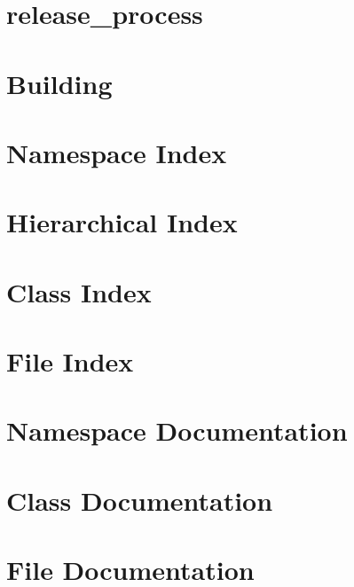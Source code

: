 \let\mypdfximage\pdfximage\def\pdfximage{\immediate\mypdfximage}\documentclass[twoside]{book}
\newcommand{\+}{\discretionary{\mbox{\scriptsize$\hookleftarrow$}}{}{}}
\newcommand{\clearemptydoublepage}{%
  \newpage{\pagestyle{empty}\cleardoublepage}%
}
\begin{document}
\chapter{release\+\_\+process}
\label{md_external_doctest_scripts_release_process}

\chapter{Building}
\label{md__r_e_a_d_m_e}

\chapter{Namespace Index}

\chapter{Hierarchical Index}

\chapter{Class Index}

\chapter{File Index}

\chapter{Namespace Documentation}

\chapter{Class Documentation}














\chapter{File Documentation}


\backmatter
\newpage
{}
\clearemptydoublepage
{}
\printindex
\end{document}
